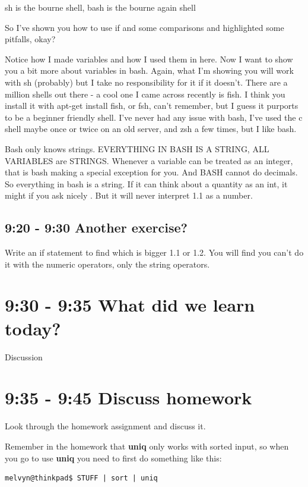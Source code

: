 \documentclass[10pt]{article}
\begin{document}
sh is the bourne shell, bash is the bourne again shell

So I've shown you how to use if and some comparisons and highlighted some pitfalls, okay?

Notice how I made variables and how I used them in here. Now I want to show you a bit more about variables in bash. Again, what I'm showing you will work with sh (probably) but I take no responsibility for it if it doesn't. There are a million shells out there - a cool one I came across recently is fish. I think you install it with apt-get install fish, or fsh, can't remember, but I guess it purports to be a beginner friendly shell. I've never had any issue with bash, I've used the c shell maybe once or twice on an old server, and zsh a few times, but I like bash.

Bash only knows strings. EVERYTHING IN BASH IS A STRING, ALL VARIABLES are
STRINGS. Whenever a variable can be treated as an integer, that is bash making a
special exception for you. And BASH cannot do decimals. So everything in bash is
a string. If it can think about a quantity as an int, it might if you ask nicely
. But it will never interpret 1.1 as a number. 

\subsection{9:20 - 9:30 Another exercise?}
Write an if statement to find which is bigger 1.1 or 1.2. You will find you
can't do it with the numeric operators, only the string operators.

\section{9:30 - 9:35 What did we learn today?}
Discussion


\section{9:35 - 9:45 Discuss homework}
Look through the homework assignment and discuss it.

Remember in the homework that \textbf{uniq} only works with sorted input, so
when you go to use \textbf{uniq} you need to first do something like this:

\begin{lstlisting}[style=term]
melvyn@thinkpad$ STUFF | sort | uniq
\end{lstlisting}
\end{document}
